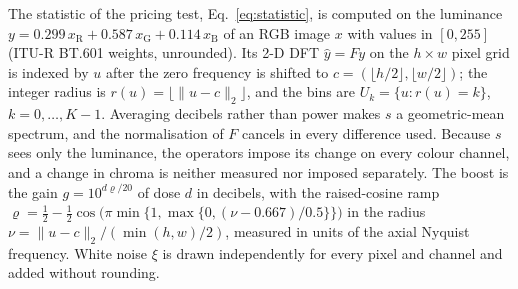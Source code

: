 \label{app:scoring}%
The statistic of the pricing test, Eq.~\eqref{eq:statistic}, is computed on
the luminance
$y = 0.299\,x_{\mathrm{R}} + 0.587\,x_{\mathrm{G}} + 0.114\,x_{\mathrm{B}}$ of
an RGB image $x$ with values in $[0, 255]$ (ITU-R BT.601 weights, unrounded).
Its 2-D DFT $\hat y = F y$ on the $h \times w$ pixel grid is indexed by $u$ after the
zero frequency is shifted to $c = (\lfloor h/2 \rfloor, \lfloor w/2 \rfloor)$;
the integer radius is $r(u) = \lfloor \lVert u - c \rVert_2 \rfloor$, and the
bins are $U_k = \{u : r(u) = k\}$, $k = 0, \dots, K-1$. Averaging decibels
rather than power makes $s$ a geometric-mean spectrum, and the normalisation of
$F$ cancels in every difference used. Because $s$ sees only the luminance, the
operators impose its change on every colour channel, and a change in chroma is
neither measured nor imposed separately. The boost is the gain
$g = 10^{d \varrho / 20}$ of dose $d$ in decibels, with the raised-cosine ramp
$\varrho = \frac12 - \frac12 \cos\big(\pi \min\{1, \max\{0, (\nu - 0.667)/0.5\}\}\big)$
in the radius $\nu = \lVert u - c \rVert_2 / (\min(h, w)/2)$, measured in units
of the axial Nyquist frequency. White noise $\xi$ is drawn independently for
every pixel and channel and added without rounding.

